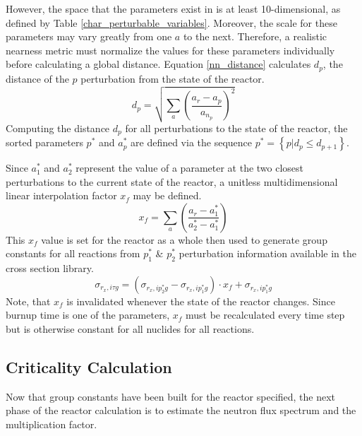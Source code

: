 However, the space that the parameters exist in is at least 10-dimensional, as defined by Table \ref{char_perturbable_variables}.  
Moreover, the scale for these parameters may vary greatly from one $a$ to the next.  Therefore, a realistic
nearness metric must normalize the values for these parameters individually before calculating a
global distance.  Equation \ref{nn_distance} calculates $d_p$, the distance of the $p$ 
perturbation from the state of the reactor.
\begin{equation}
\label{nn_distance}
d_p = \sqrt{\sum_a \left(\frac{a_r - a_p}{a_{n_p}}\right)^2}
\end{equation}
Computing the distance $d_p$ for all perturbations to the state of the reactor, 
the sorted parameters $p^*$ and $a_p^*$ are defined via the sequence $p^* = \left\{p | d_p \le d_{p+1}\right\}$.

Since $a_1^*$ and $a_2^*$ represent the value of a parameter at the two closest perturbations to the
current state of the reactor, a unitless multidimensional linear interpolation factor $x_f$ may be defined.
\begin{equation}
\label{x_factor}
x_f = \sum_a \left(\frac{a_r - a_1^*}{a_2^* - a_1^*}\right)
\end{equation}
This $x_f$ value is set for the reactor as a whole then used to generate group constants for 
all reactions from $p_1^*$ \& $p_2^*$ perturbation information available in the cross section library. 
\begin{equation}
\label{sig_multi_interp}
\sigma_{r_x,i\tau g} = (\sigma_{r_x,ip_2^*g} - \sigma_{r_x,ip_1^*g}) \cdot x_f  + \sigma_{r_x,ip_1^*g}
\end{equation}
Note, that $x_f$ is invalidated whenever the state of the reactor changes.  Since burnup time is one of 
the parameters, $x_f$ must be recalculated every time step but is otherwise constant for all nuclides
for all reactions.


\subsection{Criticality Calculation}
\label{mg_sec:crit_calc}
Now that group constants have been built for the reactor specified, the next phase of the reactor 
calculation is to estimate the neutron flux spectrum and the multiplication factor. 

